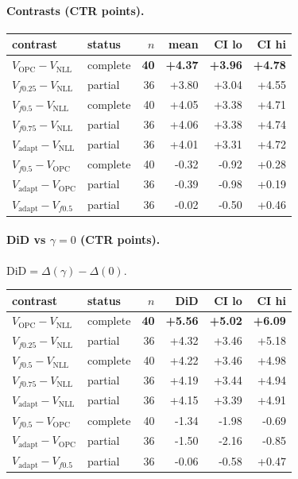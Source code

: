 \documentclass[10pt,a4paper]{article}
\begin{document}
\paragraph{Contrasts (CTR points).}
{\centering\small\begin{tabular}{llrrrr}
\toprule contrast & status & $n$ & mean & CI lo & CI hi \\
\midrule
\textbf{$V_{\mathrm{OPC}}-V_{\mathrm{NLL}}$} & complete & \textbf{40} & \textbf{+4.37} & \textbf{+3.96} & \textbf{+4.78} \\
$V_{f0.25}-V_{\mathrm{NLL}}$ & partial & 36 & +3.80 & +3.04 & +4.55 \\
$V_{f0.5}-V_{\mathrm{NLL}}$ & complete & 40 & +4.05 & +3.38 & +4.71 \\
$V_{f0.75}-V_{\mathrm{NLL}}$ & partial & 36 & +4.06 & +3.38 & +4.74 \\
$V_{\mathrm{adapt}}-V_{\mathrm{NLL}}$ & partial & 36 & +4.01 & +3.31 & +4.72 \\
$V_{f0.5}-V_{\mathrm{OPC}}$ & complete & 40 & -0.32 & -0.92 & +0.28 \\
$V_{\mathrm{adapt}}-V_{\mathrm{OPC}}$ & partial & 36 & -0.39 & -0.98 & +0.19 \\
$V_{\mathrm{adapt}}-V_{f0.5}$ & partial & 36 & -0.02 & -0.50 & +0.46 \\
\bottomrule\end{tabular}\par}
\paragraph{DiD vs $\gamma=0$ (CTR points).} $\mathrm{DiD}=\Delta(\gamma)-\Delta(0)$.
{\centering\small\begin{tabular}{llrrrr}
\toprule contrast & status & $n$ & DiD & CI lo & CI hi \\
\midrule
\textbf{$V_{\mathrm{OPC}}-V_{\mathrm{NLL}}$} & complete & \textbf{40} & \textbf{+5.56} & \textbf{+5.02} & \textbf{+6.09} \\
$V_{f0.25}-V_{\mathrm{NLL}}$ & partial & 36 & +4.32 & +3.46 & +5.18 \\
$V_{f0.5}-V_{\mathrm{NLL}}$ & complete & 40 & +4.22 & +3.46 & +4.98 \\
$V_{f0.75}-V_{\mathrm{NLL}}$ & partial & 36 & +4.19 & +3.44 & +4.94 \\
$V_{\mathrm{adapt}}-V_{\mathrm{NLL}}$ & partial & 36 & +4.15 & +3.39 & +4.91 \\
$V_{f0.5}-V_{\mathrm{OPC}}$ & complete & 40 & -1.34 & -1.98 & -0.69 \\
$V_{\mathrm{adapt}}-V_{\mathrm{OPC}}$ & partial & 36 & -1.50 & -2.16 & -0.85 \\
$V_{\mathrm{adapt}}-V_{f0.5}$ & partial & 36 & -0.06 & -0.58 & +0.47 \\
\bottomrule\end{tabular}\par}
\bigskip
\end{document}

